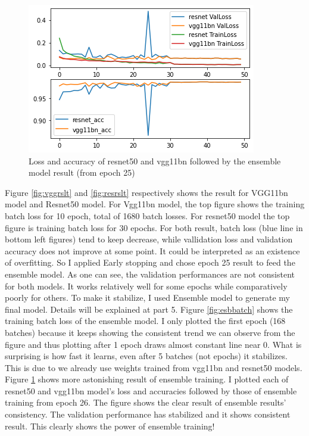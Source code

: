 \documentclass[11pt]{article}
\newcommand{\0}{{\mathbf{0}}}
\newcommand{\1}{{\mathbf{1}}}
\begin{document}
\begin{figure}[h]
      \includegraphics[width=.7\textwidth]{figures/ensemble_result.png}
      \centering
      \caption{Loss and accuracy of resnet50 and vgg11bn followed by the ensemble model result (from epoch 25)}
      \label{fig:esbrslt}
\end{figure}

Figure \ref{fig:vggrslt} and \ref{fig:resrslt} respectively shows the result for VGG11bn model and Resnet50 model. For Vgg11bn model, the top figure shows the training batch loss for 10 epoch, total of 1680 batch losses. For resnet50 model the top figure is training batch loss for 30 epochs. For both result, batch loss (blue line in bottom left figures) tend to keep decrease, while vallidation loss and validation accuracy does not improve at some point. It could be interpreted as an existence of overfitting. So I applied Early stopping and chose epoch 25 result to feed the ensemble model. As one can see, the validation performances are not consistent for both models. It works relatively well for some epochs while comparatively poorly for others. To make it stabilize, I used Ensemble model to generate my final model. Details will be explained at part 5. Figure \ref{fig:esbbatch} shows the training batch loss of the ensemble model. I only plotted the first epoch (168 batches) because it keeps showing the consistent trend we can observe from the figure and thus plotting after 1 epoch draws almost constant line near 0. What is surprising is how fast it learns, even after 5 batches (not epochs) it stabilizes. This is due to we already use weights trained from vgg11bn and resnet50 models. Figure \ref{fig:esbrslt} shows more astonishing result of ensemble training. I plotted each of resnet50 and vgg11bn model's loss and accuracies followed by those of ensemble training from epoch 26. The figure shows the clear result of ensemble results' consistency. The validation performance has stabilized and it shows consistent result. This clearly shows the power of ensemble training!
\end{document}
